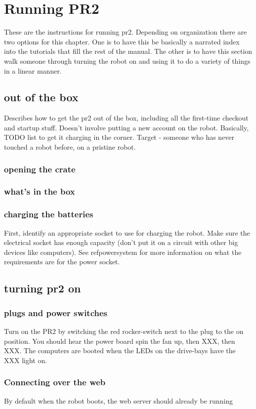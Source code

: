 \chapter{Running PR2}
These are the instructions for running pr2.  Depending on organization there are two options for this chapter.  One is to have this be basically a narrated index into the tutorials that fill the rest of the manual.  The other is to have this section walk someone through turning the robot on and using it to do a variety of things in a linear manner.
\section{out of the box}
Describes how to get the pr2 out of the box, including all the first-time checkout and startup stuff.  Doesn't involve putting a new account on the robot.  Basically, TODO list to get it charging in the corner. Target - someone who has never touched a robot before, on a pristine robot.
\subsection{opening the crate}
\subsection{what's in the box}
\subsection{charging the batteries}
First, identify an appropriate socket to use for charging the robot.  Make sure the electrical socket has enough capacity (don't put it on a circuit with other big devices like computers).   See ref{powersystem} for more information on what the requirements are for the power socket.

\section{turning pr2 on}
\subsection{plugs and power switches}
Turn on the PR2 by switching the red rocker-switch next to the plug to the on position.  You should hear the power board spin the fan up, then XXX, then XXX.  The computers are booted when the LEDs on the drive-bays have the XXX light on.


\subsection{Connecting over the web}
By default when the robot boots, the web server should already be running

